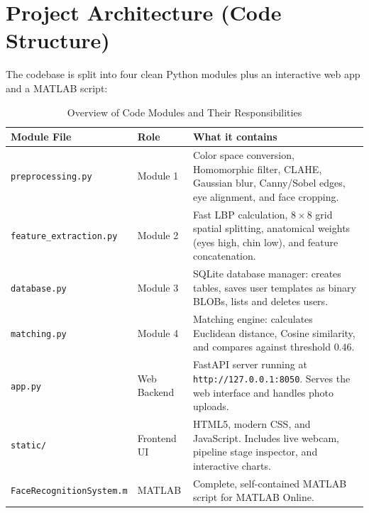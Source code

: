 \documentclass[11pt,a4paper]{article}
\begin{document}
\section{Project Architecture (Code Structure)}

The codebase is split into four clean Python modules plus an interactive web app and a MATLAB script:

\begin{table}[htbp]
    \centering
    \caption{Overview of Code Modules and Their Responsibilities}
    \vspace{0.5em}
    \begin{tabular}{llp{8.5cm}}
        \toprule
        \textbf{Module File} & \textbf{Role} & \textbf{What it contains} \\
        \midrule
        \texttt{preprocessing.py} & Module 1 & Color space conversion, Homomorphic filter, CLAHE, Gaussian blur, Canny/Sobel edges, eye alignment, and face cropping. \\
        \texttt{feature\_extraction.py} & Module 2 & Fast LBP calculation, $8\times8$ grid spatial splitting, anatomical weights (eyes high, chin low), and feature concatenation. \\
        \texttt{database.py} & Module 3 & SQLite database manager: creates tables, saves user templates as binary BLOBs, lists and deletes users. \\
        \texttt{matching.py} & Module 4 & Matching engine: calculates Euclidean distance, Cosine similarity, and compares against threshold $0.46$. \\
        \texttt{app.py} & Web Backend & FastAPI server running at \texttt{http://127.0.0.1:8050}. Serves the web interface and handles photo uploads. \\
        \texttt{static/} & Frontend UI & HTML5, modern CSS, and JavaScript. Includes live webcam, pipeline stage inspector, and interactive charts. \\
        \texttt{FaceRecognitionSystem.m} & MATLAB & Complete, self-contained MATLAB script for MATLAB Online. \\
        \bottomrule
    \end{tabular}
\end{table}

\end{document}
